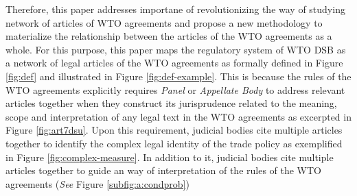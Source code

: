 


Therefore, this paper addresses importane of revolutionizing the way of studying network of articles of WTO agreements and propose a new methodology to
materialize the relationship between the articles of the WTO agreements as a whole. 
For this purpose, this paper maps
the regulatory system of WTO DSB
as a network of legal articles
of the WTO agreements as formally defined in Figure \ref{fig:def} and illustrated in Figure \ref{fig:def-example}. This is because the rules of the WTO agreements
explicitly requires \textit{Panel} or \textit{Appellate Body} to address
relevant articles together when they construct its jurisprudence related to the meaning, scope and interpretation of any legal text in the WTO agreements as excerpted in Figure \ref{fig:art7dsu}.
Upon this requirement, judicial bodies cite
multiple articles together
to identify the complex legal identity of the trade policy as exemplified in Figure \ref{fig:complex-measure}.
In addition to it, judicial bodies cite multiple articles together
to guide an way of interpretation of the rules of the WTO agreements (\textit{See} Figure \ref{subfig:a:condprob})




